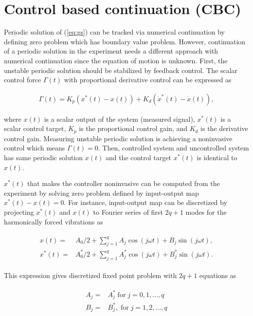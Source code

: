 \documentclass[openacc]{rsproca_new}%
\theoremstyle{own}
\newcommand{\Eref}[1]{(\ref{#1})}
\begin{document}
\section{Control based continuation (CBC)}\label{CBC}

Periodic solution of \Eref{eq:gs} can be tracked via numerical continuation by defining zero problem which has boundary value problem. However, continuation of a periodic solution in the experiment needs a different approach with numerical continuation since the equation of motion is unknown. First, the unstable periodic solution should be stabilized by feedback control. The scalar control force $\Gamma(t)$ with proportional derivative control can be expressed as

\begin{align}
  \Gamma(t)=K_p(x^*(t)-x(t))+K_d(\dot x^*(t)-\dot x(t)),
\end{align}

\noindent where $x(t)$ is a scalar output of the system (measured signal), $x^*(t)$ is a scalar control target, $K_p$ is the proportional control gain, and $K_d$ is the derivative control gain. Measuring unstable periodic solution is achieving a noninvasive control which means $\Gamma(t)=0$. Then, controlled system and uncontrolled system has same periodic solution $x(t)$ and the control target $x^*(t)$ is identical to $x(t)$.

$x^*(t)$ that makes the controller noninvasive can be computed from the experiment by solving zero problem defined by input-output map $x^*(t)-x(t)=0$. For instance, input-output map can be discretized by projecting $x^*(t)$ and $x(t)$ to Fourier series of first $2q+1$ modes for the harmonically forced vibrations as

\begin{align}\label{eq:dis}
  \begin{split}
  x(t)=&A_0/2+  \sum_{j=1}^{q} A_j \cos (j\omega t)+B_j \sin (j\omega t),\\
  x^*(t)=&A_0^*/2+  \sum_{j=1}^{q} A^*_j \cos (j\omega t)+B^*_j \sin (j\omega t).
\end{split}
\end{align}

\noindent This expression gives discretized fixed point problem with $2q+1$ equations as

\begin{align}\label{eq:zp}
  \begin{split}
  A_j=&A^*_j \; \textrm{for} \; j=0,1,\ldots,q\\
  B_j=&B^*_j,\; \textrm{for} \; j=1,2,\ldots,q
\end{split}
\end{align}
\end{document}
